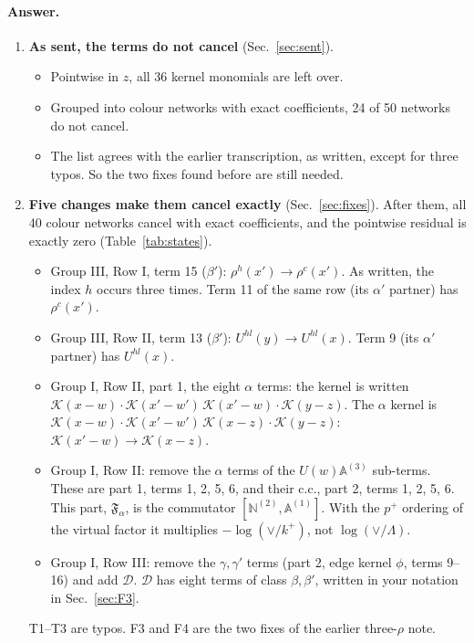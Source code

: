 \documentclass[10pt]{article}
\numberwithin{equation}{section}
\newcommand{\KK}{\mathcal K}
\begin{document}
\paragraph{Answer.}
\begin{enumerate}
\item \textbf{As sent, the terms do not cancel} (Sec.~\ref{sec:sent}).
\begin{itemize}
\item Pointwise in $z$, all 36 kernel monomials are left over.
\item Grouped into colour networks with exact coefficients, 24 of 50 networks do not cancel.
\item The list agrees with the earlier transcription, as written, except for three typos. So the two fixes found before are still needed.
\end{itemize}
\item \textbf{Five changes make them cancel exactly} (Sec.~\ref{sec:fixes}). After them, all 40 colour networks cancel with exact coefficients, and the pointwise residual is exactly zero (Table~\ref{tab:states}).
\begin{itemize}
\item[T1] Group III, Row I, term 15 ($\beta'$): $\rho^h(x')\to\rho^c(x')$. As written, the index $h$ occurs three times. Term 11 of the same row (its $\alpha'$ partner) has $\rho^c(x')$.
\item[T2] Group III, Row II, term 13 ($\beta'$): $U^{hl}(y)\to U^{hl}(x)$. Term 9 (its $\alpha'$ partner) has $U^{hl}(x)$.
\item[T3] Group I, Row II, part 1, the eight $\alpha$ terms: the kernel is written $\KK(x-w)\cdot\KK(x'-w')\,\KK(x'-w)\cdot\KK(y-z)$. The $\alpha$ kernel is $\KK(x-w)\cdot\KK(x'-w')\,\KK(x-z)\cdot\KK(y-z)$: $\KK(x'-w)\to\KK(x-z)$.
\item[F4] Group I, Row II: remove the $\alpha$ terms of the $U(w)\mathbb A^{(3)}$ sub-terms. These are part 1, terms 1, 2, 5, 6, and their c.c., part 2, terms 1, 2, 5, 6. This part, $\mathfrak F_\alpha$, is the commutator $[\mathbb N^{(2)},\mathbb A^{(1)}]$. With the $p^+$ ordering of the virtual factor it multiplies $-\log(\vee/k^+)$, not $\log(\vee/\Lambda)$.
\item[F3] Group I, Row III: remove the $\gamma,\gamma'$ terms (part 2, edge kernel $\phi$, terms 9--16) and add $\mathcal D$. $\mathcal D$ has eight terms of class $\beta,\beta'$, written in your notation in Sec.~\ref{sec:F3}.
\end{itemize}
T1--T3 are typos. F3 and F4 are the two fixes of the earlier three-$\rho$ note.

\end{enumerate}
\end{document}
